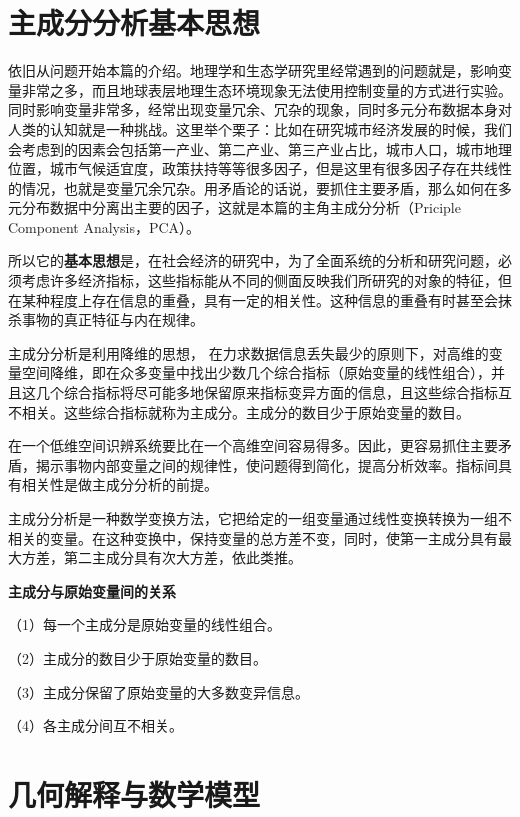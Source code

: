 \documentclass[]{ctexbook}
\begin{document}
\hypertarget{ux4e3bux6210ux5206ux5206ux6790ux57faux672cux601dux60f3}{%
\section{主成分分析基本思想}\label{ux4e3bux6210ux5206ux5206ux6790ux57faux672cux601dux60f3}}

依旧从问题开始本篇的介绍。地理学和生态学研究里经常遇到的问题就是，影响变量非常之多，而且地球表层地理生态环境现象无法使用控制变量的方式进行实验。同时影响变量非常多，经常出现变量冗余、冗杂的现象，同时多元分布数据本身对人类的认知就是一种挑战。这里举个栗子：比如在研究城市经济发展的时候，我们会考虑到的因素会包括第一产业、第二产业、第三产业占比，城市人口，城市地理位置，城市气候适宜度，政策扶持等等很多因子，但是这里有很多因子存在共线性的情况，也就是变量冗余冗杂。用矛盾论的话说，要抓住主要矛盾，那么如何在多元分布数据中分离出主要的因子，这就是本篇的主角主成分分析（Priciple Component Analysis，PCA）。

所以它的\textbf{基本思想}是，在社会经济的研究中，为了全面系统的分析和研究问题，必须考虑许多经济指标，这些指标能从不同的侧面反映我们所研究的对象的特征，但在某种程度上存在信息的重叠，具有一定的相关性。这种信息的重叠有时甚至会抹杀事物的真正特征与内在规律。

主成分分析是利用降维的思想， 在力求数据信息丢失最少的原则下，对高维的变量空间降维，即在众多变量中找出少数几个综合指标（原始变量的线性组合），并且这几个综合指标将尽可能多地保留原来指标变异方面的信息，且这些综合指标互不相关。这些综合指标就称为主成分。主成分的数目少于原始变量的数目。

在一个低维空间识辨系统要比在一个高维空间容易得多。因此，更容易抓住主要矛盾，揭示事物内部变量之间的规律性，使问题得到简化，提高分析效率。指标间具有相关性是做主成分分析的前提。

主成分分析是一种数学变换方法，它把给定的一组变量通过线性变换转换为一组不相关的变量。在这种变换中，保持变量的总方差不变，同时，使第一主成分具有最大方差，第二主成分具有次大方差，依此类推。

\textbf{主成分与原始变量间的关系}

（1）每一个主成分是原始变量的线性组合。

（2）主成分的数目少于原始变量的数目。

（3）主成分保留了原始变量的大多数变异信息。

（4）各主成分间互不相关。

\hypertarget{ux51e0ux4f55ux89e3ux91caux4e0eux6570ux5b66ux6a21ux578b}{%
\section{几何解释与数学模型}\label{ux51e0ux4f55ux89e3ux91caux4e0eux6570ux5b66ux6a21ux578b}}
\end{document}
